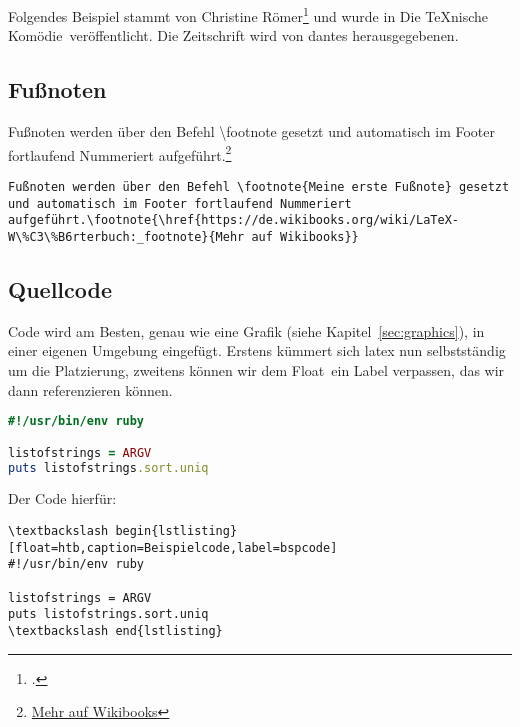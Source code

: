 
Folgendes Beispiel stammt von Christine Römer\footcite{dtk17.1:roemer:tikz} und wurde in \glqq Die \TeX{}nische Komödie\grqq\ veröffentlicht. Die Zeitschrift wird von \glspl{dante} herausgegebenen.
\subsection{Fußnoten}%
\label{sec:footn}
Fußnoten werden über den Befehl \textbackslash footnote gesetzt und automatisch im Footer fortlaufend Nummeriert aufgeführt.\footnote{\href{https://de.wikibooks.org/wiki/LaTeX-W\%C3\%B6rterbuch:_footnote}{Mehr auf Wikibooks}}
\begin{lstlisting}[float=htb,caption=Das Setzen von Fußnoten mit \protect\LaTeX{},label=lst:footnotes]
Fußnoten werden über den Befehl \footnote{Meine erste Fußnote} gesetzt und automatisch im Footer fortlaufend Nummeriert aufgeführt.\footnote{\href{https://de.wikibooks.org/wiki/LaTeX-W\%C3\%B6rterbuch:_footnote}{Mehr auf Wikibooks}}
\end{lstlisting}
\subsection{Quellcode}%
\label{sec:code}
Code wird am Besten, genau wie eine Grafik (siehe Kapitel~\ref{sec:graphics}), in einer eigenen Umgebung eingefügt. Erstens kümmert sich \gls{latex} nun selbstständig um die Platzierung, zweitens können wir dem \glqq Float\grqq\ ein Label verpassen, das wir dann referenzieren können.

\begin{lstlisting}[language=Ruby,float=htb,caption=Beispielcode,label=bspcode]
#!/usr/bin/env ruby

listofstrings = ARGV
puts listofstrings.sort.uniq
\end{lstlisting}

Der Code hierfür:
\begin{lstlisting}[float=htb,caption=Darstellung eines beliebigen Codes in der Sprache ruby,label=lst:ruby]
\textbackslash begin{lstlisting}[float=htb,caption=Beispielcode,label=bspcode]
#!/usr/bin/env ruby

listofstrings = ARGV
puts listofstrings.sort.uniq
\textbackslash end{lstlisting}
\end{lstlisting}


